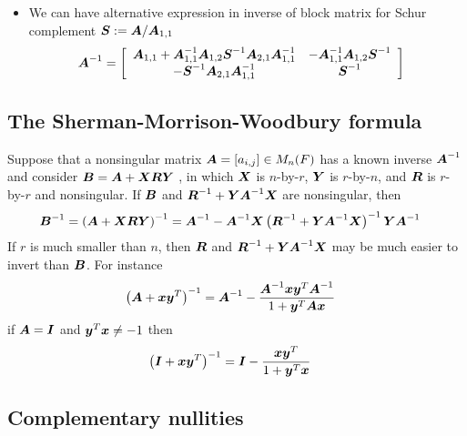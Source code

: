 \documentclass[11pt]{article}
\begin{document}
\begin{itemize}
\item We can have alternative expression in inverse of block matrix for Schur complement $\boldsymbol{S} := \boldsymbol{A}/ \boldsymbol{A}_{1,1}$
\begin{align}
\boldsymbol{A}^{-1} &= \left[ \begin{array}{cc}
\boldsymbol{A}_{1,1} + \boldsymbol{A}_{1,1}^{-1}\boldsymbol{A}_{1,2}\boldsymbol{S}^{-1}\boldsymbol{A}_{2,1}\boldsymbol{A}_{1,1}^{-1} & -\boldsymbol{A}_{1,1}^{-1}\boldsymbol{A}_{1,2}\boldsymbol{S}^{-1}\\
-\boldsymbol{S}^{-1}\boldsymbol{A}_{2,1}\boldsymbol{A}_{1,1}^{-1} &\boldsymbol{S}^{-1}
\end{array} \right]\label{eqn: block_matrix_inversion_2}
\end{align}
\end{itemize}

\subsection{The Sherman-Morrison-Woodbury formula}
Suppose that a nonsingular matrix $\boldsymbol{A} = [a_{i,j}] \in M_{n}(F)$ has a known inverse $\boldsymbol{A}^{-1}$ and consider $\boldsymbol{B} = \boldsymbol{A} + \boldsymbol{X} \boldsymbol{R} \boldsymbol{Y}$ , in which $\boldsymbol{X}$ is $n$-by-$r$, $\boldsymbol{Y}$ is $r$-by-$n$, and $\boldsymbol{R}$ is $r$-by-$r$ and nonsingular. If $\boldsymbol{B}$ and $\boldsymbol{R}^{-1} + \boldsymbol{Y} \boldsymbol{A}^{-1}  \boldsymbol{X}$  are nonsingular, then
\begin{align}
\boldsymbol{B}^{-1} = \left( \boldsymbol{A} + \boldsymbol{X} \boldsymbol{R} \boldsymbol{Y}\right)^{-1} &= \boldsymbol{A}^{-1} - \boldsymbol{A}^{-1}\boldsymbol{X}\left(\boldsymbol{R}^{-1} + \boldsymbol{Y} \boldsymbol{A}^{-1}  \boldsymbol{X}\right)^{-1} \boldsymbol{Y}\boldsymbol{A}^{-1}  \label{eqn: sherman_morrison_woodbury}
\end{align} If $r$ is much smaller than $n$, then $\boldsymbol{R}$ and $\boldsymbol{R}^{-1} + \boldsymbol{Y} \boldsymbol{A}^{-1}  \boldsymbol{X}$ may be much easier to invert than $\boldsymbol{B}$.
For instance
\begin{align}
\left( \boldsymbol{A} + \boldsymbol{x}\boldsymbol{y}^{T}\right)^{-1} &=  \boldsymbol{A}^{-1} -  \frac{\boldsymbol{A}^{-1}\boldsymbol{x}\boldsymbol{y}^{T}\boldsymbol{A}^{-1}}{1 + \boldsymbol{y}^{T} \boldsymbol{A} \boldsymbol{x}}\label{eqn: sherman_morrison_woodbury_rank_1_inverse}
\end{align} if $\boldsymbol{A} = \boldsymbol{I}$ and $ \boldsymbol{y}^{T}\boldsymbol{x} \neq -1$ then
\begin{align}
\left( \boldsymbol{I} + \boldsymbol{x}\boldsymbol{y}^{T}\right)^{-1} &=  \boldsymbol{I} -  \frac{\boldsymbol{x}\boldsymbol{y}^{T}}{1 + \boldsymbol{y}^{T} \boldsymbol{x}} \label{eqn: sherman_morrison_woodbury_rank_1_inverse2}
\end{align}


\subsection{Complementary nullities}
\end{document}
